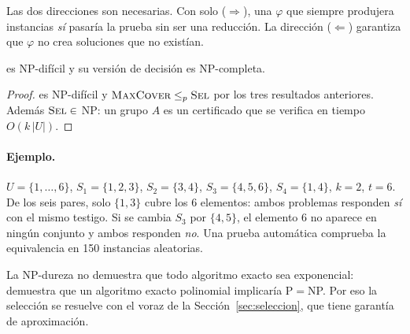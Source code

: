 \noindent Las dos direcciones son necesarias. Con solo ($\Rightarrow$), una $\varphi$ que siempre
produjera instancias \emph{sí} pasaría la prueba sin ser una reducción. La dirección
($\Leftarrow$) garantiza que $\varphi$ no crea soluciones que no existían.

\begin{teorema}
\SEL{} es NP-difícil y su versión de decisión es NP-completa.
\end{teorema}
\begin{proof}
\MC{} es NP-difícil y $\textsc{MaxCover}\le_p\textsc{Sel}$ por los tres resultados anteriores. Además $\textsc{Sel}\in$ NP: un
grupo $A$ es un certificado que se verifica en tiempo $O(k\,|U|)$.
\end{proof}

\paragraph{Ejemplo.} $U=\{1,\dots,6\}$, $S_1=\{1,2,3\}$, $S_2=\{3,4\}$, $S_3=\{4,5,6\}$,
$S_4=\{1,4\}$, $k=2$, $t=6$. De los seis pares, solo $\{1,3\}$ cubre los 6 elementos: ambos
problemas responden \emph{sí} con el mismo testigo. Si se cambia $S_3$ por $\{4,5\}$, el elemento 6
no aparece en ningún conjunto y ambos responden \emph{no}. Una prueba automática comprueba la equivalencia en 150 instancias
aleatorias.

\begin{observacion}
La NP-dureza no demuestra que todo algoritmo exacto sea exponencial: demuestra que un algoritmo
exacto polinomial implicaría P$=$NP. Por eso la selección se resuelve con el voraz de la
Sección~\ref{sec:seleccion}, que tiene garantía de aproximación.
\end{observacion}
